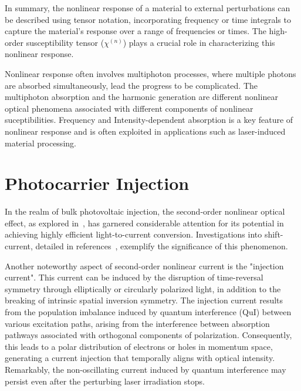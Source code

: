 In summary, the nonlinear response of a material to external perturbations can be described using
tensor notation, incorporating frequency or time integrals to capture the material's response over
a range of frequencies or times. The high-order susceptibility tensor ($\chi^{(n)}$) plays a crucial role in characterizing this nonlinear response.


Nonlinear response often involves multiphoton processes, where multiple photons are absorbed
simultaneously, lead the progress to be complicated. The multiphoton absorption and the harmonic
generation are different nonlinear optical phenomena associated with different components of
nonlinear suceptibilities.
Frequency and Intensity-dependent absorption is a key feature of nonlinear response and is often exploited in applications such as laser-induced material processing.

\section{Photocarrier Injection}
In the realm of bulk photovoltaic injection, the second-order nonlinear optical effect, as explored in~\cite{PhysRevB.61.5337}, has garnered considerable attention for its potential in achieving highly efficient light-to-current conversion. Investigations into shift-current, detailed in references~\cite{PhysRevLett.107.126805,doi:10.1126/science.1168636,Yang2010,10.1063/5.0101513}, exemplify the significance of this phenomenon.

Another noteworthy aspect of second-order nonlinear current is the "injection
current"\cite{sipe2000second,laman2005ultrafast,
	10.1063/1.125084,PhysRevB.61.5337,10.1063/1.2131191}. This current can be induced by the disruption
of time-reversal symmetry through elliptically or circularly polarized light, in addition to the
breaking of intrinsic spatial inversion symmetry. The injection current results from the population
imbalance induced by quantum interference (\gls{QuI}) between various excitation paths, arising
from the interference between absorption pathways associated with orthogonal components of
polarization. Consequently, this leads to a polar distribution of electrons or holes in momentum
space, generating a current injection that temporally aligns with optical intensity. Remarkably,
the non-oscillating current induced by quantum interference may persist even after the perturbing
laser irradiation stops.

